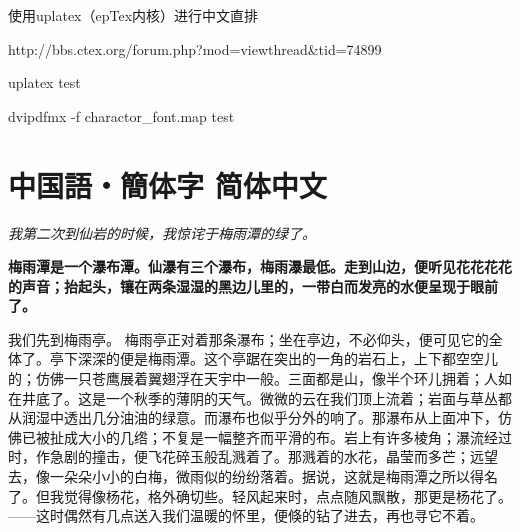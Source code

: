 \documentclass[fontset=none]{utbook}
\DeclareRobustCommand\jpnrm{\kanjifamily{jpnrm}\selectfont}
\DeclareRobustCommand\schrm{\kanjifamily{schrm}\selectfont}
\DeclareRobustCommand\tchrm{\kanjifamily{tchrm}\selectfont}
\DeclareRobustCommand\korrm{\kanjifamily{korrm}\selectfont}
\begin{document}
使用uplatex（epTex内核）进行中文直排

http://bbs.ctex.org/forum.php?mod=viewthread\&tid=74899

uplatex test 

dvipdfmx -f charactor\_font.map test





\section{中国語・簡体字 简体中文}
\Large

\textit{我第二次到仙岩的时候，我惊诧于梅雨潭的绿了。}

\textbf{梅雨潭是一个瀑布潭。仙瀑有三个瀑布，梅雨瀑最低。走到山边，便听见花花花花的声音；抬起头，镶在两条湿湿的黑边儿里的，一带白而发亮的水便呈现于眼前了。}

\textsc{我们先到梅雨亭。} 梅雨亭正对着那条瀑布；坐在亭边，不必仰头，便可见它的全体了。亭下深深的便是梅雨潭。这个亭踞在突出的一角的岩石上，上下都空空儿的；仿佛一只苍鹰展着翼翅浮在天宇中一般。三面都是山，像半个环儿拥着；人如在井底了。这是一个秋季的薄阴的天气。微微的云在我们顶上流着；岩面与草丛都从润湿中透出几分油油的绿意。而瀑布也似乎分外的响了。那瀑布从上面冲下，仿佛已被扯成大小的几绺；不复是一幅整齐而平滑的布。岩上有许多棱角；瀑流经过时，作急剧的撞击，便飞花碎玉般乱溅着了。那溅着的水花，晶莹而多芒；远望去，像一朵朵小小的白梅，微雨似的纷纷落着。据说，这就是梅雨潭之所以得名了。但我觉得像杨花，格外确切些。轻风起来时，点点随风飘散，那更是杨花了。——这时偶然有几点送入我们温暖的怀里，便倏的钻了进去，再也寻它不着。
\end{document}
